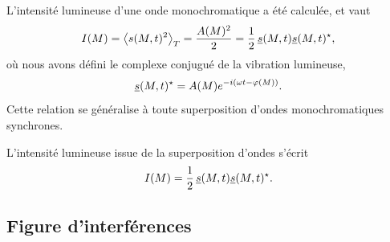 \documentclass[12pt,fancy]{cours}
\begin{document}
L'intensité lumineuse d'une onde monochromatique a été calculée, et vaut 
$$
I(M) = \left\langle {s(M,t)^2} \right\rangle_T = \frac{A(M)^2}{2} = \frac{1}{2} \, \underline{s}(M,t) \underline{s}(M,t)^\star,
$$
où nous avons défini le complexe conjugué de la vibration lumineuse,
$$
\underline{s}(M,t)^\star = A(M) e^{-i(\omega t - \varphi(M))}.
$$
Cette relation se généralise à toute superposition d'ondes monochromatiques synchrones.
\begin{prop}\label{prop:}
  L'intensité lumineuse issue de la superposition d'ondes  s'écrit 
  $$
I(M) = \frac{1}{2} \, \underline{s}(M,t) \underline{s}(M,t)^\star.
  $$
\end{prop}


\subsection{Figure d'interférences}
\end{document}
